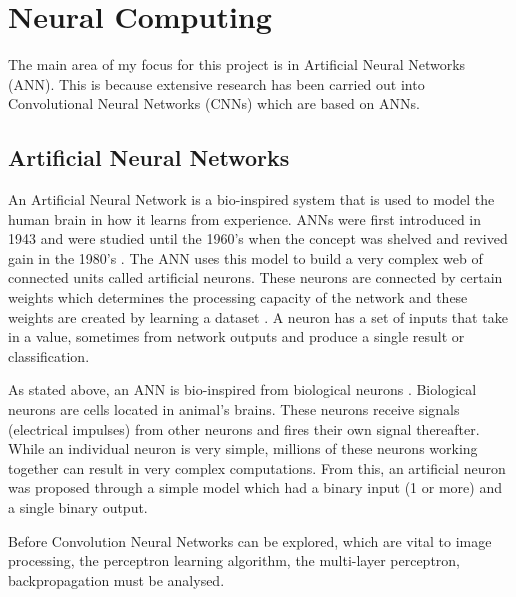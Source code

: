 \section{Neural Computing}
The main area of my focus for this project is in
Artificial Neural Networks (ANN). This is because extensive research has been carried out into Convolutional Neural Networks (CNNs) which are based on ANNs.
\tocless\subsection{Artificial Neural Networks}
An Artificial Neural Network is a bio-inspired system that is used to model the human brain in how it learns from experience.
ANNs were first introduced in 1943 and were studied until the 1960's when the concept was shelved and revived gain in the 1980's \parencite{handsOnML}.
The ANN uses this model to build a very complex web of connected units called
artificial neurons.
These neurons are connected by certain weights which determines the processing
capacity of the network and these weights are created by learning a
dataset \parencite{malachy}.
A neuron has a set of inputs that take in a value, sometimes from network outputs
and produce a single result or classification.

As stated above, an ANN is bio-inspired from biological neurons \parencite{handsOnML}.
Biological neurons are cells located in animal's brains.
These neurons receive signals (electrical impulses) from other neurons and fires their own signal thereafter.
While an individual neuron is very simple, millions of these neurons working together can result in very complex computations.
From this, an artificial neuron was proposed through a simple model which had a binary input (1 or more) and a single binary output.


Before Convolution Neural Networks can be explored, which are vital to image
processing, the perceptron learning algorithm, the multi-layer perceptron, backpropagation must be analysed.




